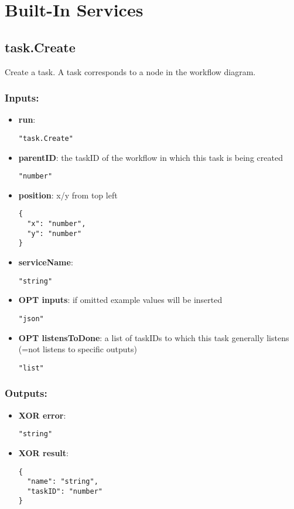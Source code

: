 \section{Built-In Services}
\label{ch:builtinservices}

\subsection{task.Create}
Create a task. A task corresponds to a node in the workflow diagram.
\subsubsection*{Inputs:}
\begin{itemize}
    \item \textbf{run}: 
\begin{lstlisting}
"task.Create"
\end{lstlisting}
    \item \textbf{parentID}: the taskID of the workflow in which this task is being created
\begin{lstlisting}
"number"
\end{lstlisting}
    \item \textbf{position}: x/y from top left
\begin{lstlisting}
{
  "x": "number", 
  "y": "number"
}
\end{lstlisting}
    \item \textbf{serviceName}: 
\begin{lstlisting}
"string"
\end{lstlisting}
    \item \textbf{OPT inputs}: if omitted example values will be inserted
\begin{lstlisting}
"json"
\end{lstlisting}
    \item \textbf{OPT listensToDone}: a list of taskIDs to which this task generally listens (=not listens to specific outputs)
\begin{lstlisting}
"list"
\end{lstlisting}
  \end{itemize}

\subsubsection*{Outputs:}
\begin{itemize}
    \item \textbf{XOR error}: 
\begin{lstlisting}
"string"
\end{lstlisting}
    \item \textbf{XOR result}: 
\begin{lstlisting}
{
  "name": "string", 
  "taskID": "number"
}
\end{lstlisting}
  \end{itemize}

